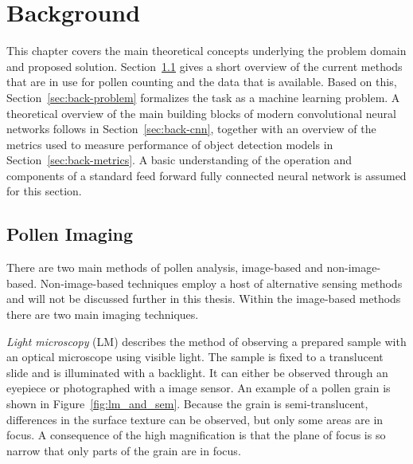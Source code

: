 \chapter{Background}\label{cha:background}
This chapter covers the main theoretical concepts underlying the problem domain and proposed solution.
Section~\ref{sec:back-pollen} gives a short overview of the current methods that are in use for pollen counting and the data that is available. Based on this, Section~\ref{sec:back-problem} formalizes the task as a machine learning problem.
A theoretical overview of the main building blocks of modern convolutional neural networks follows in Section~\ref{sec:back-cnn}, together with an overview of the metrics used to measure performance of object detection models in Section~\ref{sec:back-metrics}.
A basic understanding of the operation and components of a standard feed forward fully connected neural network is assumed for this section.

\section{Pollen Imaging}\label{sec:back-pollen}
There are two main methods of pollen analysis, image-based and non-image-based.
Non-image-based techniques employ a host of alternative sensing methods and will not be discussed further in this thesis.
Within the image-based methods there are two main imaging techniques.

\textit{Light microscopy} (LM) describes the method of observing a prepared sample with an optical microscope using visible light.
The sample is fixed to a translucent slide and is illuminated with a backlight.
It can either be observed through an eyepiece or photographed with a image sensor.
An example of a pollen grain is shown in Figure~\ref{fig:lm_and_sem}.
Because the grain is semi-translucent, differences in the surface texture can be observed, but only some areas are in focus.
A consequence of the high magnification is that the plane of focus is so narrow that only parts of the grain are in focus.

